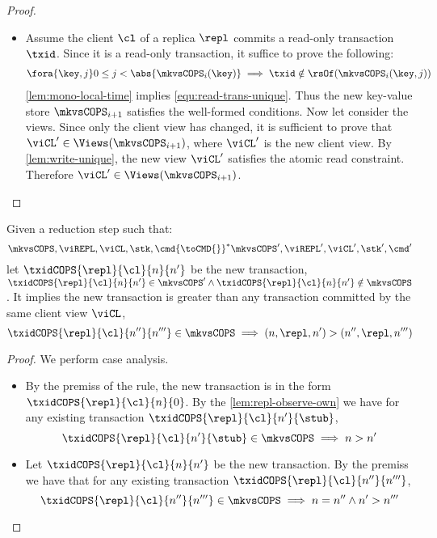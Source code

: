 \begin{proof}
\begin{itemize}
\begin{itemize}
            \item {}
                Assume the client \( \cl \) of a replica \( \repl \) commits a read-only transaction \( \txid \).
                Since it is a read-only transaction, it suffice to prove the following:
                \begin{gather}
                    \fora{\key,j} 0 \leq j < \abs{ \mkvsCOPS_i(\key) } \implies \txid \notin \rsOf(\mkvsCOPS_{i}(\key, j)) \label{equ:read-trans-unique} 
                \end{gather}
                \cref{lem:mono-local-time} implies \cref{equ:read-trans-unique}.
                Thus the new key-value store \( \mkvsCOPS_{i+1} \) satisfies the well-formed conditions.
                Now let consider the views.
                Since only the client view has changed, it is sufficient to  prove that \( \viCL' \in \Views(\mkvsCOPS_{i+1}) \), 
                where \( \viCL' \) is the new client view.
                By \cref{lem:write-unique}, the new view \( \viCL' \) satisfies the atomic read constraint.
                Therefore \( \viCL' \in \Views(\mkvsCOPS_{i+1})  \).
        \end{itemize}
    \end{itemize}
\end{proof}



\begin{lemma}
    \label{lem:mono-local-time}
    Given a reduction step such that: 
    \[
        \mkvsCOPS, \viREPL, \viCL, \stk, \cmd {\toCMD{}}^* \mkvsCOPS', \viREPL', \viCL', \stk', \cmd'
    \]
    let \( \txidCOPS{\repl}{\cl}{n}{n'} \) be the new transaction, \ie \( \txidCOPS{\repl}{\cl}{n}{n'} \in \mkvsCOPS' \land  \txidCOPS{\repl}{\cl}{n}{n'} \notin \mkvsCOPS \).
    It implies the new transaction is greater than any transaction committed by the same client view \( \viCL \), \ie
    \[ 
        \txidCOPS{\repl}{\cl}{n''}{n'''} \in \mkvsCOPS \implies (n,\repl,n') > (n'', \repl, n''')
    \]
\end{lemma}
\begin{proof}
    We perform case analysis.
    \begin{itemize}
        \item {}
            By the premiss of the rule, 
            the new transaction is in the form \( \txidCOPS{\repl}{\cl}{n}{0} \).
            By the \cref{lem:repl-observe-own} we have for any existing transaction \( \txidCOPS{\repl}{\cl}{n'}{\stub} \),
            \[
                \txidCOPS{\repl}{\cl}{n'}{\stub} \in \mkvsCOPS \implies n > n'
            \]
        \item {}
            Let \( \txidCOPS{\repl}{\cl}{n}{n'} \) be the new transaction.
            By the premiss we have that for any existing transaction \( \txidCOPS{\repl}{\cl}{n''}{n'''} \), 
            \[
                \txidCOPS{\repl}{\cl}{n''}{n'''} \in \mkvsCOPS \implies n = n'' \land n' > n'''
            \]
    \end{itemize}
\end{proof}

